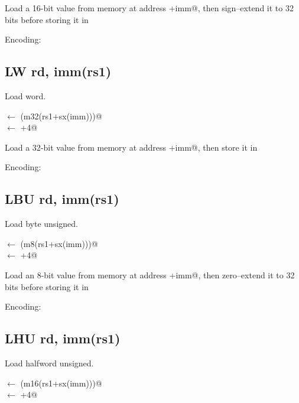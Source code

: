 Load a 16-bit value from memory at address +imm@, then 
sign--extend it to 32 bits before storing it in \verb@rd@


Encoding:


\subsection{LW rd, imm(rs1)}

Load word.

\verb@rd@ $\leftarrow$ \verb@sx(m32(rs1+sx(imm)))@\\
\verb@pc@ $\leftarrow$ \verb@pc+4@

Load a 32-bit value from memory at address +imm@, then 
store it in \verb@rd@

Encoding:



\subsection{LBU rd, imm(rs1)}

Load byte unsigned.

\verb@rd@ $\leftarrow$ \verb@zx(m8(rs1+sx(imm)))@\\
\verb@pc@ $\leftarrow$ \verb@pc+4@

Load an 8-bit value from memory at address +imm@, then 
zero--extend it to 32 bits before storing it in \verb@rd@

Encoding:


\subsection{LHU rd, imm(rs1)}

Load halfword unsigned.

\verb@rd@ $\leftarrow$ \verb@zx(m16(rs1+sx(imm)))@\\
\verb@pc@ $\leftarrow$ \verb@pc+4@

